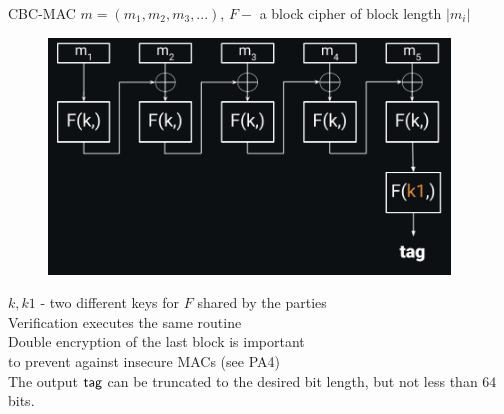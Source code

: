 \documentclass[usenames,dvipsnames, 9pt]{beamer}
\begin{document}
\begin{frame}{CBC-MAC}
\Large
 $m = (m_1, m_2, m_3, ...)$, $F-$ a block cipher of block length $|m_i|$  
	\begin{figure}
		\includegraphics[width=0.95\textwidth]{CBC_MAC}
	\end{figure}
\vspace{-90pt}
\pause
\Large 
$k, k1$ - two different keys for $F $  shared by the parties\\ [10pt]
\pause
Verification executes the same routine \\ [10pt]
\pause
Double encryption of the last block is important \\
to prevent against insecure MACs (see PA4) \\[15pt]
The output $\textsf{tag}$ can be truncated to the desired bit length, but not less than $64$ bits.
\end{frame}
\end{document}
